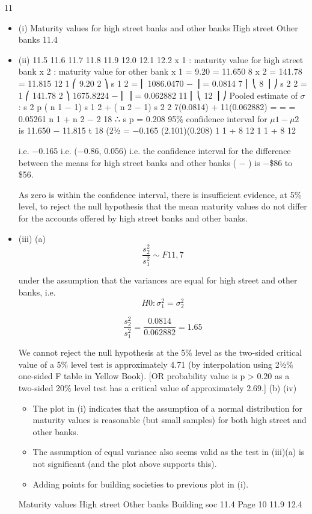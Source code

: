 \documentclass[a4paper,12pt]{article}
\begin{document}
\newpage
11
\begin{itemize}
\item (i)
Maturity values for high street banks and other banks
High street
Other banks
11.4
\item (ii)
11.5
11.6
11.7
11.8
11.9
12.0
12.1
12.2
x 1 : maturity value for high street bank
x 2 : maturity value for other bank
x 1 = 9.20
= 11.650
8
x 2 = 141.78
= 11.815
12
1 ⎛
9.20 2 ⎞
s 1 2 = ⎜ 1086.0470 −
⎟ = 0.0814
7 ⎜ ⎝
8 ⎟ ⎠
s 2 2 =
1 ⎛
141.78 2 ⎞
1675.8224
−
⎜
⎟ = 0.062882
11 ⎜ ⎝
12 ⎟ ⎠
Pooled estimate of $\sigma$:
s 2 p
( n 1 − 1) s 1 2 + ( n 2 − 1) s 2 2 7(0.0814) + 11(0.062882)
=
=
= 0.05261
n 1 + n 2 − 2
18
∴ s p = 0.208
95\% confidence interval for $\mu  1 − \mu  2$ is
11.650 − 11.815 \pm t 18 (21⁄2%
= −0.165 \pm (2.101)(0.208)
1 1
+
8 12
1 1
+
8 12

i.e. −0.165 
i.e. (−0.86, 0.056)
i.e. the confidence interval for the difference between the means for high street banks and other banks ( −  ) is −\$86 to \$56.

\medskip

As zero is within the confidence interval, there is insufficient evidence, at 5\% level, to reject the null hypothesis that the mean maturity values do not differ
for the accounts offered by high street banks and other banks.
\item (iii)
(a)
\[ \frac{ s^{2}_{2} }{ s^{2}_{1}}  \sim F 11,7 \]

under the assumption that the variances are equal for high street and
other banks,
i.e. \[H 0 : \sigma^{2}_{1} = \sigma^{2}_{2}\]

\[ \frac{ s^{2}_{2} }{ s^{2}_{1}} = \frac{0.0814}{0.062882} = 1.65 \]




We cannot reject the null hypothesis at the 5\% level as the two-sided critical value of a 5\% level test is approximately 4.71 (by interpolation using 21⁄2\% one-sided F table in Yellow Book).
[OR probability value is p > 0.20 as a two-sided 20\% level test has a critical value of approximately 2.69.]
(b)
(iv)
\begin{itemize}
\item The plot in (i) indicates that the assumption of a normal distribution for maturity values is reasonable (but small samples) for both high street
and other banks. 
\item The assumption of equal variance also seems valid as the test in (iii)(a) is not significant (and the plot above supports this).
\item Adding points for building societies to previous plot in (i).
\end{itemize}
Maturity values
High street
Other banks
Building soc
11.4
Page 10
11.9
12.4


\end{itemize}
\end{document}
